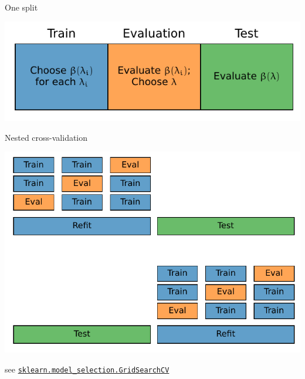 \documentclass[presentation,mathserif,table]{beamer}
\begin{document}
\begin{frame}[label={sec:orge123826}]{One split}
\begin{center}
\includegraphics[width=.9\linewidth]{figures/generated/train_eval_test/datasets.pdf}
\end{center}
\end{frame}
\begin{frame}[label={sec:org59ef20d},fragile]{Nested cross-validation}
 \begin{center}
\includegraphics[width=.9\linewidth]{figures/generated/train_eval_test/cv.pdf}
\end{center}
see  \href{https://scikit-learn.org/stable/modules/generated/sklearn.model\_selection.GridSearchCV.html}{\texttt{sklearn.model\_selection.GridSearchCV}}
\end{frame}
\end{document}
